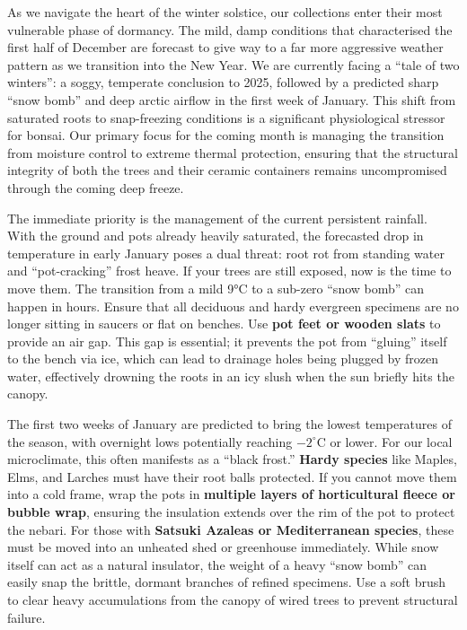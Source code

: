 \label{2026-01-care}
\vfill

\noindent
As we navigate the heart of the winter solstice, our collections enter their most vulnerable phase of dormancy.
The mild, damp conditions that characterised the first half of December are forecast to give way to a far more aggressive weather pattern as we transition into the New Year.
We are currently facing a ``tale of two winters'': a soggy, temperate conclusion to 2025, followed by a predicted sharp ``snow bomb'' and deep arctic airflow in the first week of January.
This shift from saturated roots to snap\--freezing conditions is a significant physiological stressor for bonsai.
Our primary focus for the coming month is managing the transition from moisture control to extreme thermal protection, ensuring that the structural integrity of both the trees and their ceramic containers remains uncompromised through the coming deep freeze.

\medskip
{}
\noindent
The immediate priority is the management of the current persistent rainfall.
With the ground and pots already heavily saturated, the forecasted drop in temperature in early January poses a dual threat: root rot from standing water and ``pot\--cracking'' frost heave.
If your trees are still exposed, now is the time to move them.
The transition from a mild 9°C to a sub\--zero ``snow bomb'' can happen in hours.
Ensure that all deciduous and hardy evergreen specimens are no longer sitting in saucers or flat on benches.
Use \textbf{pot feet or wooden slats} to provide an air gap.
This gap is essential; it prevents the pot from ``gluing'' itself to the bench via ice, which can lead to drainage holes being plugged by frozen water, effectively drowning the roots in an icy slush when the sun briefly hits the canopy.

\medskip
{}
\noindent
The first two weeks of January are predicted to bring the lowest temperatures of the season, with overnight lows potentially reaching $-2^\circ$C or lower.
For our local microclimate, this often manifests as a ``black frost.'' \textbf{Hardy species} like Maples, Elms, and Larches must have their root balls protected.
If you cannot move them into a cold frame, wrap the pots in \textbf{multiple layers of horticultural fleece or bubble wrap}, ensuring the insulation extends over the rim of the pot to protect the nebari.
For those with \textbf{Satsuki Azaleas or Mediterranean species}, these must be moved into an unheated shed or greenhouse immediately.
While snow itself can act as a natural insulator, the weight of a heavy ``snow bomb'' can easily snap the brittle, dormant branches of refined specimens.
Use a soft brush to clear heavy accumulations from the canopy of wired trees to prevent structural failure.

